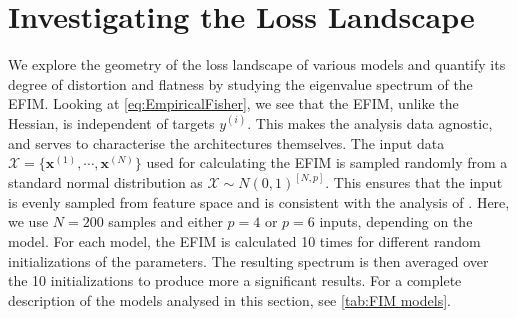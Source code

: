 \section{Investigating the Loss Landscape}\label{sec:Investigating the Loss Landscape}
We explore the geometry of the loss landscape of various models and quantify its degree of distortion and flatness by studying the eigenvalue spectrum of the EFIM. Looking at \autoref{eq:EmpiricalFisher}, we see that the EFIM, unlike the Hessian, is independent of targets $y^{(i)}$. This makes the analysis data agnostic, and serves to characterise the architectures themselves. The input data $\mathcal{X} = \{\boldsymbol{x}^{(1)}, \cdots, \boldsymbol{x}^{(N)}\}$ used for calculating the EFIM is sampled randomly from a standard normal distribution as $\mathcal{X} \sim N(0,1)^{[N,p]}$. This ensures that the input is evenly sampled from feature space and is consistent with the analysis of \citet{abbas2020power}. Here, we use $N=200$ samples and either $p=4$ or $p=6$ inputs, depending on the model. For each model, the EFIM is calculated 10 times for different random initializations of the parameters. The resulting spectrum is then averaged over the 10 initializations to produce more a significant results. For a complete description of the models analysed in this section, see \autoref{tab:FIM models}.

